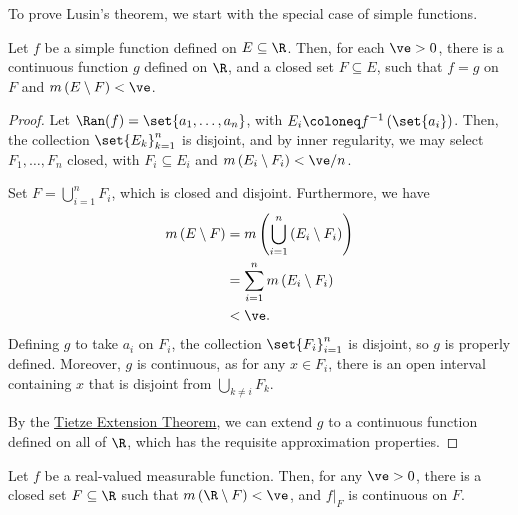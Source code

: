 \documentclass[10pt]{mypackage}
\begin{document}
To prove Lusin's theorem, we start with the special case of simple functions.
\begin{lemma}
  Let $f$ be a simple function defined on $E\subseteq \R$. Then, for each $\ve > 0$, there is a continuous function $g$ defined on $\R$, and a closed set $F\subseteq E$, such that $f = g$ on $F$ and $m\left( E\setminus F \right) < \ve$.
\end{lemma}
\begin{proof}
  Let $\Ran(f) = \set{a_1,\dots,a_n}$, with $E_i \coloneq f^{-1}\left( \set{a_i} \right)$. Then, the collection $\set{E_k}_{k=1}^{n}$ is disjoint, and by inner regularity, we may select $F_1,\dots,F_n$ closed, with $F_i\subseteq E_i$ and $m\left( E_i\setminus F_i  \right) < \ve/n$.\newline

  Set $F = \bigcup_{i=1}^{n}F_i$, which is closed and disjoint. Furthermore, we have
  \begin{align*}
    m\left( E\setminus F \right) &= m\left( \bigcup_{i=1}^{n}\left( E_i\setminus F_i \right) \right)\\
                                 &= \sum_{i=1}^{n}m\left( E_i\setminus F_i \right)\\
                                 &< \ve.
  \end{align*}
  Defining $g$ to take $a_i$ on $F_i$, the collection $\set{F_i}_{i=1}^{n}$ is disjoint, so $g$ is properly defined. Moreover, $g$ is continuous, as for any $x\in F_i$, there is an open interval containing $x$ that is disjoint from $\bigcup_{k\neq i}F_k$.\newline

  By the \href{https://ncatlab.org/nlab/show/Tietze+extension+theorem}{Tietze Extension Theorem}, we can extend $g$ to a continuous function defined on all of $\R$, which has the requisite approximation properties.
\end{proof}
\begin{theorem}
  Let $f$ be a real-valued measurable function. Then, for any $\ve > 0$, there is a closed set $F\subseteq \R$ such that $m\left( \R\setminus F \right) < \ve$, and $f|_{F}$ is continuous on $F$.
\end{theorem}
\end{document}
